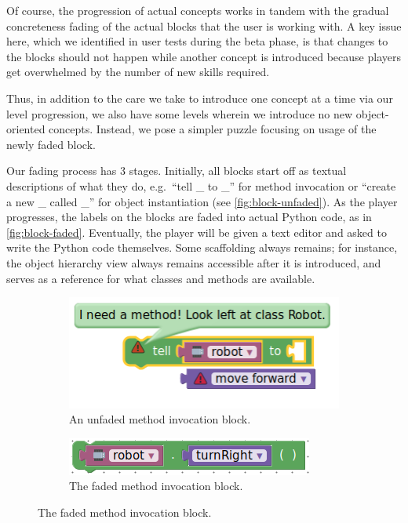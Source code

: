 \documentclass[12pt,notitlepage]{article}
\begin{document}
Of course, the progression of actual concepts works in tandem with the
gradual concreteness fading of the actual blocks that the user is
working with. A key issue here, which we identified in user tests during
the beta phase, is that changes to the blocks should not happen while
another concept is introduced because players get overwhelmed by the
number of new skills required.

Thus, in addition to the care we take to introduce one concept at a
time via our level progression, we also have some levels wherein we
introduce no new object-oriented concepts. Instead, we pose a simpler
puzzle focusing on usage of the newly faded block.

Our fading process has 3 stages. Initially, all blocks start off as
textual descriptions of what they do, e.g.\ ``tell \_ to \_'' for
method invocation or ``create a new \_ called \_'' for object
instantiation (see \autoref{fig:block-unfaded}). As the player
progresses, the labels on the blocks are faded into actual Python code,
as in \autoref{fig:block-faded}. Eventually, the player will be given
a text editor and asked to write the Python code themselves. Some
scaffolding always remains; for instance, the object hierarchy view always
remains accessible after it is introduced, and serves as a reference for
what classes and methods are available.

\begin{figure}[h]
\centering
\begin{subfigure}{.5\textwidth}
  \centering
  \includegraphics[width=.5\textwidth]{block_unfaded}
  \caption{An unfaded method invocation block.}\label{fig:block-unfaded}
\end{subfigure}%
\begin{subfigure}{.5\textwidth}
  \centering
  \includegraphics[width=.5\textwidth]{block_faded}
  \caption{The faded method invocation block.}\label{fig:block-faded}
\end{subfigure}
\label{fig:test}
\end{figure}
\end{document}
